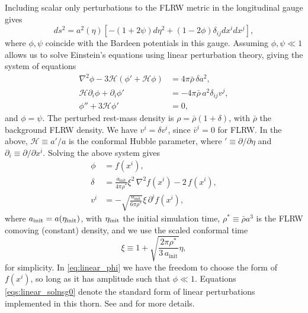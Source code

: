 Including scalar only perturbations to the FLRW metric in the longitudinal gauge gives
\begin{equation}\label{eq:perturbed_metric}
	ds^2 = a^2(\eta) \left[ - \left(1 + 2\psi\right) d\eta^2 + \left(1 - 2\phi \right) \delta_{ij}dx^i dx^j \right],
\end{equation}
where $\phi,\psi$ coincide with the Bardeen potentials \cite{bardeen1980} in this gauge. Assuming $\phi,\psi\ll1$ allows us to solve Einstein's equations using linear perturbation theory, giving the system of equations \cite{macpherson2017,macpherson2019}
 \begin{subequations} \label{eqs:perturbed_einstein}
	\begin{align}
		\nabla^{2}\phi - 3 \mathcal{H}\left(\phi' + \mathcal{H} \phi\right) &= 4\pi  \bar{\rho}\,\delta a^{2}, \label{eq:einstein_1} \\ 
		\mathcal{H} \partial_{i}\phi + \partial_{i}\phi' &= -4\pi \bar{\rho} \,a^{2} \delta_{ij}v^{j}, \label{eq:einstein_2} \\ 
		\phi'' + 3\mathcal{H}\phi' &=0, \label{eq:einstein_3}
	\end{align}	
\end{subequations}
and $\phi=\psi$. The perturbed rest-mass density is $\rho = \bar{\rho} \left(1 + \delta \right)$, with $\bar{\rho}$ the background FLRW density. We have $v^i = \delta v^i$, since $\bar{v}^i = 0$ for FLRW. In the above, $\mathcal{H}\equiv a'/a$ is the conformal Hubble parameter, where $'\equiv \partial/\partial\eta$ and $\partial_i \equiv \partial/\partial x^i$. Solving the above system gives
\begin{subequations} \label{eqs:linear_solnsg0}
    \begin{align}
    	\phi &= f(x^{i}), \label{eq:linear_phi}\\
     	\delta &= \frac{a_{\mathrm{init}}}{4\pi\rho^{*}} \xi^{2}\, \nabla^{2}f(x^{i}) - 2 \,f(x^{i}), \\
     	v^{i} &= -\sqrt{\frac{a_{\mathrm{init}}}{6\pi\rho^{*}}} \xi\, \partial^{i}f(x^{i}),
    \end{align}
\end{subequations}
where $a_{\mathrm{init}} = a(\eta_{\rm init})$, with $\eta_{\rm init}$ the initial simulation time, $\rho^*\equiv \bar{\rho}a^3$ is the FLRW comoving (constant) density, and we use the scaled conformal time
\begin{equation}
	\xi \equiv 1 + \sqrt{\frac{2\pi\rho^{*}}{3\,a_\mathrm{init}}}\eta,
\end{equation}
for simplicity. In \eqref{eq:linear_phi} we have the freedom to choose the form of $f(x^i)$, so long as it has amplitude such that $\phi\ll1$. Equations \eqref{eqs:linear_solnsg0} denote the standard form of linear perturbations implemented in this thorn. See \cite{macpherson2017} and \cite{macpherson2019} for more details. 

